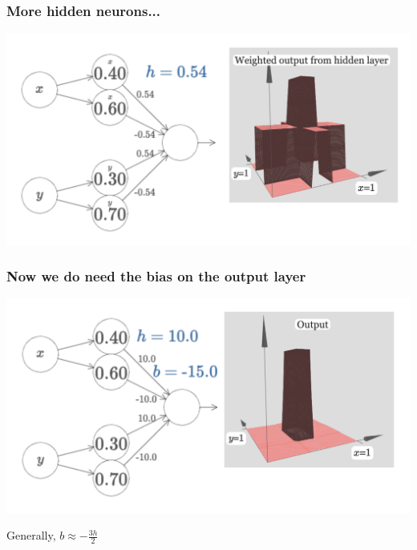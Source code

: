 \documentclass[usenames,dvipsnames]{beamer}
\begin{document}

\begin{frame}
  \frametitle{More hidden neurons...}
  
  \centering
  \includegraphics[scale=.4]{more-multi}
  
\end{frame}


\begin{frame}
  \frametitle{Now we do need the bias on the output layer}
  
    \centering
  \includegraphics[scale=.4]{tower}
  
  
  Generally, $b \approx -\frac{3h}{2}$
  
\end{frame}

\end{document}
